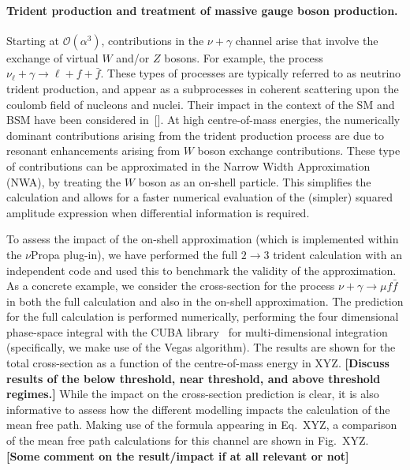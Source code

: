 \documentclass[a4paper,11pt]{article}
\newcommand{\alert}[1]{{\bf \color{red}[{#1}]}}
\begin{document}
\paragraph{Trident production and treatment of massive gauge boson production.}
Starting at $\mathcal{O}(\alpha^3)$, contributions in the $\nu + \gamma$ channel arise that involve the exchange of virtual $W$ and/or $Z$ bosons. 
For example, the process $\nu_{\ell} + \gamma \to \ell + f + \bar f$. 
These types of processes are typically referred to as neutrino trident production, and appear as a subprocesses in coherent scattering upon the coulomb field of nucleons and nuclei.
Their impact in the context of the SM and BSM have been considered in~[].
At high centre-of-mass energies, the numerically dominant contributions arising from the trident production process are due to resonant enhancements arising from $W$ boson exchange contributions.
%
These type of contributions can be approximated in the Narrow Width Approximation (NWA), by treating the $W$ boson as an on-shell particle.
This simplifies the calculation and allows for a faster numerical evaluation of the (simpler) squared amplitude expression when differential information is required.

To assess the impact of the on-shell approximation (which is implemented within the $\nu$Propa plug-in), we have performed the full $2\to3$ trident calculation with an independent code and used this to benchmark the validity of the approximation.
%
As a concrete example, we consider the cross-section for the process  $\nu + \gamma \to \mu f \bar f$ in both the full calculation and also in the on-shell approximation.
The prediction for the full calculation is performed numerically, performing the four dimensional phase-space integral with the \textsc{CUBA} library~\cite{Hahn:2004fe} for multi-dimensional integration (specifically, we make use of the Vegas algorithm).
%
The results are shown for the total cross-section as a function of the centre-of-mass energy in XYZ.
\alert{Discuss results of the below threshold, near threshold, and above threshold regimes.}
While the impact on the cross-section prediction is clear, it is also informative to assess how the different modelling impacts the calculation of the mean free path.
%
Making use of the formula appearing in Eq.~XYZ, a comparison of the mean free path calculations for this channel are shown in Fig.~XYZ.
%
\alert{Some comment on the result/impact if at all relevant or not}
\end{document}

